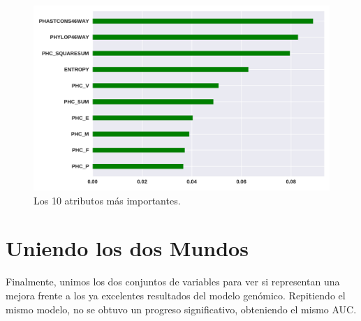 \begin{figure}[H]
    \centering
    \includegraphics[scale=0.73]{documents/latex/figures/3/importance_2.pdf}
    \caption{Los 10 atributos más importantes.}
    \label{fig:importance_2}
\end{figure}





\section{Uniendo los dos Mundos}

Finalmente, unimos los dos conjuntos de variables para ver si representan una mejora frente a los ya excelentes resultados del modelo genómico. Repitiendo el mismo modelo, no se obtuvo un progreso significativo, obteniendo el mismo AUC. 

